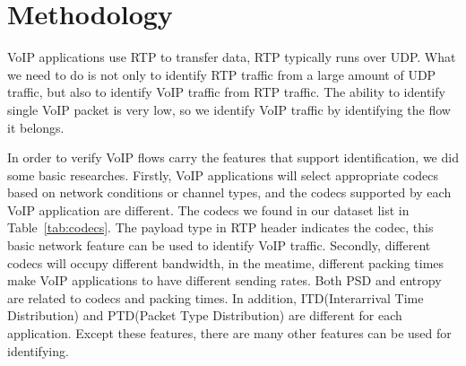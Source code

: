 \documentclass[conference]{IEEEtran}
\begin{document}

\section{Methodology}
\label{sec:methodology}

VoIP applications use RTP to transfer data, RTP typically runs over UDP. What we need to do is not only to identify RTP traffic from a large amount of UDP traffic, but also to identify VoIP traffic from RTP traffic. The ability to identify single VoIP packet is very low, so we identify VoIP traffic by identifying the flow it belongs.

In order to verify VoIP flows carry the features that support identification, we did some basic researches. Firstly, VoIP applications will select appropriate codecs based on network conditions or channel types, and the codecs supported by each VoIP application are different. The codecs we found in our dataset list in Table~\ref{tab:codecs}. The payload type in RTP header indicates the codec, this basic network feature can be used to identify VoIP traffic. Secondly, different codecs will occupy different bandwidth, in the meatime, different packing times make VoIP applications to have different sending rates. Both PSD \cite{22} and entropy \cite{4} are related to codecs and packing times. In addition, ITD(Interarrival Time Distribution) and PTD(Packet Type Distribution) are different for each application. Except these features, there are many other features can be used for identifying.
\end{document}

